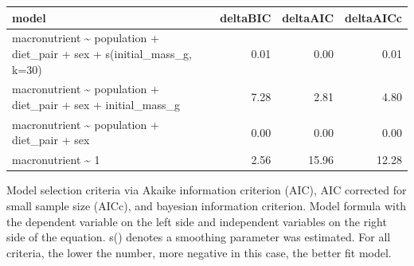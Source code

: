 \documentclass[
]{article}
\begin{document}
\begin{tbl}

\begin{minipage}{\linewidth}

\begingroup
\setlength{}
\setlength{}\fontsize{8.2pt}{9.9pt}\selectfont
\begin{longtable*}{@{\extracolsep{\fill}}lrrr}
\toprule
model & deltaBIC & deltaAIC & deltaAICc \\ 
\midrule\addlinespace[2.5pt]
macronutrient \textasciitilde{} population + diet\_pair + sex + s(initial\_mass\_g, k=30) & 0.01 & 0.00 & 0.01 \\ 
macronutrient \textasciitilde{} population + diet\_pair + sex + initial\_mass\_g & 7.28 & 2.81 & 4.80 \\ 
macronutrient \textasciitilde{} population + diet\_pair + sex & 0.00 & 0.00 & 0.00 \\ 
macronutrient \textasciitilde{} 1 & 2.56 & 15.96 & 12.28 \\ 
\bottomrule
\end{longtable*}
\endgroup

\end{minipage}%

\caption{\label{tbl-field-population-choice-experiment-model-selection-criteria}Model
selection criteria via Akaike information criterion (AIC), AIC corrected
for small sample size (AICc), and bayesian information criterion. Model
formula with the dependent variable on the left side and independent
variables on the right side of the equation. s() denotes a smoothing
parameter was estimated. For all criteria, the lower the number, more
negative in this case, the better fit model.}

\end{tbl}%
\end{document}
